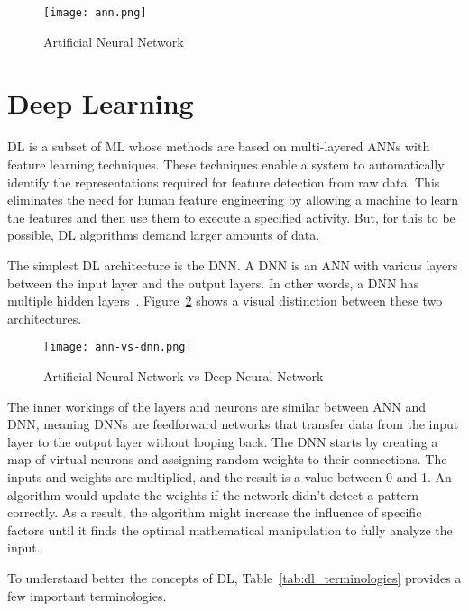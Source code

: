 \begin{figure}[htbp]
    \centering
    \texttt{[image: ann.png]}
    \caption{Artificial Neural Network}
    \label{fig:ann}
\end{figure}

\section{Deep Learning}\label{sec:dl}

\gls{DL} is a subset of \gls{ML} whose methods are based on multi-layered \gls{ANN}s with feature learning techniques. These techniques enable a system to automatically identify the representations required for feature detection from raw data. This eliminates the need for human feature engineering by allowing a machine to learn the features and then use them to execute a specified activity. But, for this to be possible, \gls{DL} algorithms demand larger amounts of data.

The simplest \gls{DL} architecture is the \gls{DNN}. A \gls{DNN} is an \gls{ANN} with various layers between the input layer and the output layers. In other words, a \gls{DNN} has multiple hidden layers~\cite{Schmidhuber2015DeepOverview}. Figure~\ref{fig:ann-vs-dnn} shows a visual distinction between these two architectures.

\begin{figure}[htbp]
    \centering
    \texttt{[image: ann-vs-dnn.png]}
    \caption{Artificial Neural Network vs Deep Neural Network}
    \label{fig:ann-vs-dnn}
\end{figure}

The inner workings of the layers and neurons are similar between \gls{ANN} and \gls{DNN}, meaning \gls{DNN}s are feedforward networks that transfer data from the input layer to the output layer without looping back. The \gls{DNN} starts by creating a map of virtual neurons and assigning random weights to their connections. The inputs and weights are multiplied, and the result is a value between 0 and 1. An algorithm would update the weights if the network didn't detect a pattern correctly. As a result, the algorithm might increase the influence of specific factors until it finds the optimal mathematical manipulation to fully analyze the input.

To understand better the concepts of \gls{DL}, Table~\ref{tab:dl_terminologies} provides a few important terminologies.


